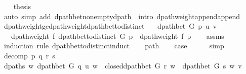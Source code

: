 \begin{isabellebody}
\ \ \isamarkupfalse%
\ {\isacharquery}{\kern0pt}thesis\isanewline
\ \ \ \ \isamarkupfalse%
\ {\isacharparenleft}{\kern0pt}auto\ simp\ add{\isacharcolon}{\kern0pt}\ dpath{\isacharunderscore}{\kern0pt}bet{\isacharunderscore}{\kern0pt}nonempty{\isacharunderscore}{\kern0pt}dpath{\isacharparenleft}{\kern0pt}{}{\isacharcomma}{\kern0pt}\ {}{\isacharparenright}{\kern0pt}\ intro{\isacharcolon}{\kern0pt}\ dpath{\isacharunderscore}{\kern0pt}weight{\isacharunderscore}{\kern0pt}append{\isacharunderscore}{\kern0pt}append{\isacharparenright}{\kern0pt}\isanewline
{}\isamarkupfalse%
%
\endisatagproof
{\isafoldproof}%
%
\isadelimproof
\isanewline
%
\endisadelimproof
\isanewline
{}\isamarkupfalse%
\ dpath{\isacharunderscore}{\kern0pt}weight{\isacharunderscore}{\kern0pt}ge{\isacharunderscore}{\kern0pt}dpath{\isacharunderscore}{\kern0pt}weight{\isacharunderscore}{\kern0pt}dpath{\isacharunderscore}{\kern0pt}bet{\isacharunderscore}{\kern0pt}to{\isacharunderscore}{\kern0pt}distinct{\isacharcolon}{\kern0pt}\isanewline
\ \ \ {\isachardoublequoteopen}dpath{\isacharunderscore}{\kern0pt}bet\ G\ p\ u\ v{\isachardoublequoteclose}\isanewline
\ \ \ {\isachardoublequoteopen}dpath{\isacharunderscore}{\kern0pt}weight\ f\ {\isacharparenleft}{\kern0pt}dpath{\isacharunderscore}{\kern0pt}bet{\isacharunderscore}{\kern0pt}to{\isacharunderscore}{\kern0pt}distinct\ G\ p{\isacharparenright}{\kern0pt}\ {\isasymle}\ dpath{\isacharunderscore}{\kern0pt}weight\ f\ p{\isachardoublequoteclose}\isanewline
%
\isadelimproof
\ \ %
\endisadelimproof
%
\isatagproof
{}\isamarkupfalse%
\ assms\isanewline
{}\isamarkupfalse%
\ {\isacharparenleft}{\kern0pt}induction\ rule{\isacharcolon}{\kern0pt}\ dpath{\isacharunderscore}{\kern0pt}bet{\isacharunderscore}{\kern0pt}to{\isacharunderscore}{\kern0pt}distinct{\isacharunderscore}{\kern0pt}induct{\isacharparenright}{\kern0pt}\isanewline
\ \ \isamarkupfalse%
\ path\isanewline
\ \ \isamarkupfalse%
\ {\isacharquery}{\kern0pt}case\isanewline
\ \ \ \ \isamarkupfalse%
\ simp\isanewline
{}\isamarkupfalse%
\isanewline
\ \ \isamarkupfalse%
\ {\isacharparenleft}{\kern0pt}decomp\ p\ q\ r\ s{\isacharparenright}{\kern0pt}\isanewline
\ \ \isamarkupfalse%
\ dpaths{\isacharcolon}{\kern0pt}\ {\isachardoublequoteopen}{\isasymexists}w{\isachardot}{\kern0pt}\ dpath{\isacharunderscore}{\kern0pt}bet\ G\ q\ u\ w\ {\isasymand}\ closed{\isacharunderscore}{\kern0pt}dpath{\isacharunderscore}{\kern0pt}bet\ G\ r\ w\ {\isasymand}\ dpath{\isacharunderscore}{\kern0pt}bet\ G\ s\ w\ v{\isachardoublequoteclose}\isanewline

\end{isabellebody}
